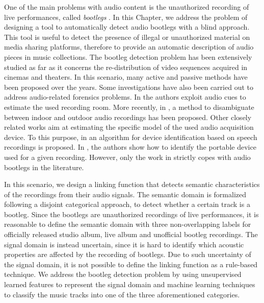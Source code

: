 One of the main problems with audio content is the unauthorized recording of live performances, called \textit{bootlegs} \cite{Bestagini2013b}. In this Chapter, we address the problem of designing a tool to automatically detect audio bootlegs with a blind approach. This tool is useful to detect the presence of illegal or unauthorized material on media sharing platforms, therefore to provide an automatic description of audio pieces in music collections. The bootleg detection problem has been extensively studied as far as it concerns the re-distribution of video sequences acquired in cinemas and theaters. In this scenario, many active \cite{Haitsma2001,Doerr2003,Robert2013} and passive \cite{Visentini-Scarzanella2012,Bestagini2013a} methods have been proposed over the years. Some investigations have also been carried out to address audio-related forensics problems. In \cite{Peters2012} the authors exploit audio cues to estimate the used recording room. More recently, in \cite{Milani2014}, a method to disambiguate between indoor and outdoor audio recordings has been proposed. Other closely related works aim at estimating the specific model of the used audio acquisition device. To this purpose, in \cite{Garcia-Romero2010} an algorithm for device identification based on speech recordings is proposed. In \cite{Cuccovillo2013}, the authors show how to identify the portable device used for a given recording. However, only the work in \cite{Bestagini2013b} strictly copes with audio bootlegs in the literature.

In this scenario, we design a linking function that detects semantic characteristics of the recordings from their audio signals. The semantic domain is formalized following a disjoint categorical approach, to detect whether a certain track is a bootleg. Since the bootlegs are unauthorized recordings of live performances, it is reasonable to define the semantic domain with three non-overlapping labels for officially released studio album, live album and unofficial bootleg recordings. The signal domain is instead uncertain, since it is hard to identify which acoustic properties are affected by the recording of bootlegs. Due to such uncertainty of the signal domain, it is not possible to define the linking function as a rule-based technique. We address the bootleg detection problem by using unsupervised learned features to represent the signal domain and machine learning techniques to classify the music tracks into one of the three aforementioned categories.

